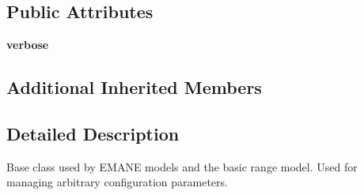 \subsection*{Public Attributes}
\begin{DoxyCompactItemize}
\item 
\hypertarget{classcore_1_1mobility_1_1_wireless_model_a6556b9fabe17c7e5ab4d7c247b8a5796}{{\bfseries verbose}}\label{classcore_1_1mobility_1_1_wireless_model_a6556b9fabe17c7e5ab4d7c247b8a5796}

\end{DoxyCompactItemize}
\subsection*{Additional Inherited Members}


\subsection{Detailed Description}
\begin{DoxyVerb}Base class used by EMANE models and the basic range model. 
Used for managing arbitrary configuration parameters.
\end{DoxyVerb}
 

